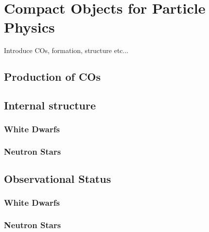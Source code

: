 \graphicspath{{img/chapter_2/}}

\chapter{Compact Objects for Particle Physics}
\label{chapter:compactobjects}

\begin{synopsis}
  Introduce COs, formation, structure etc...  
\end{synopsis}

  \section{Production of COs}

  \section{Internal structure}
  \subsection{White Dwarfs}

  \subsection{Neutron Stars}

  \section{Observational Status}

  \subsection{White Dwarfs}

  \subsection{Neutron Stars}

  
